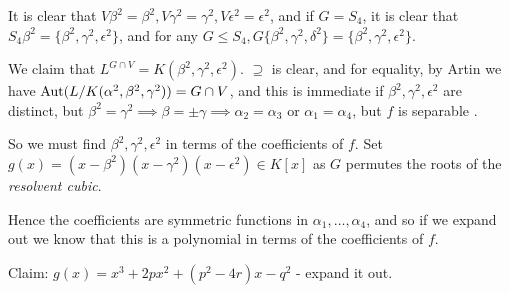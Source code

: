 \documentclass[10pt,a4paper]{article}
\begin{document}
It is clear that $V\beta^2 = \beta^2, V\gamma^2=\gamma^2, V \epsilon^2 = \epsilon^2$, and if $G = S_4$, it is clear that $S_4 \beta^2 = \{\beta^2, \gamma^2, \epsilon^2\}$, and for any $G \leq S_4, G \{\beta^2, \gamma^2, \delta^2\} = \{\beta^2, \gamma^2, \epsilon^2\}$.

We claim that $L^{G \cap V} = K(\beta^2, \gamma^2, \epsilon^2)$. $\supseteq$ is clear, and for equality, by Artin we have $\operatorname{Aut}(L/K(\alpha^2, \beta^2, \gamma^2)) = G \cap V$, and this is immediate if $\beta^2, \gamma^2, \epsilon^2$ are distinct, but $\beta^2 = \gamma^2 \implies \beta =\pm \gamma \implies \alpha_2=\alpha_3$ or $\alpha_1=\alpha_4$, but $f$ is separable \contr.

So we must find $\beta^2, \gamma^2, \epsilon^2$ in terms of the coefficients of $f$. Set $g(x) = (x-\beta^2)(x-\gamma^2)(x-\epsilon^2) \in K[x]$ as $G$ permutes the roots of the \emph{resolvent cubic}.

Hence the coefficients are symmetric functions in $\alpha_1, \ldots, \alpha_4$, and so if we expand out we know that this is a polynomial in terms of the coefficients of $f$.

Claim: $g(x) = x^3 + 2px^2 + (p^2-4r)x - q^2$ - expand it out. 
\end{document}
